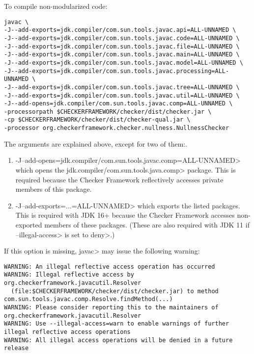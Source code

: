 
To compile non-modularized code:

\begin{Verbatim}
javac \
-J--add-exports=jdk.compiler/com.sun.tools.javac.api=ALL-UNNAMED \
-J--add-exports=jdk.compiler/com.sun.tools.javac.code=ALL-UNNAMED \
-J--add-exports=jdk.compiler/com.sun.tools.javac.file=ALL-UNNAMED \
-J--add-exports=jdk.compiler/com.sun.tools.javac.main=ALL-UNNAMED \
-J--add-exports=jdk.compiler/com.sun.tools.javac.model=ALL-UNNAMED \
-J--add-exports=jdk.compiler/com.sun.tools.javac.processing=ALL-UNNAMED \
-J--add-exports=jdk.compiler/com.sun.tools.javac.tree=ALL-UNNAMED \
-J--add-exports=jdk.compiler/com.sun.tools.javac.util=ALL-UNNAMED \
-J--add-opens=jdk.compiler/com.sun.tools.javac.comp=ALL-UNNAMED \
-processorpath $CHECKERFRAMEWORK/checker/dist/checker.jar \
-cp $CHECKERFRAMEWORK/checker/dist/checker-qual.jar \
-processor org.checkerframework.checker.nullness.NullnessChecker
\end{Verbatim}

The arguments are explained above, except for two of them:.
\begin{enumerate}

\item \<-J--add-opens=jdk.compiler/com.sun.tools.javac.comp=ALL-UNNAMED> which
opens the \<jdk.compiler/com.sun.tools.java.comp> package.  This is
required because the Checker Framework reflectively accesses private members of this package.

\item \<-J--add-exports=...=ALL-UNNAMED> which exports the listed packages.  This is
required with JDK 16+ because the Checker Framework accesses non-exported members of these packages.
(These are also required with JDK 11 if \<--illegal-access> is set to \<deny>.)

\end{enumerate}

If this option is missing, \<javac> may issue the following warning:
\begin{Verbatim}
WARNING: An illegal reflective access operation has occurred
WARNING: Illegal reflective access by org.checkerframework.javacutil.Resolver
  (file:$CHECKERFRAMEWORK/checker/dist/checker.jar) to method com.sun.tools.javac.comp.Resolve.findMethod(...)
WARNING: Please consider reporting this to the maintainers of org.checkerframework.javacutil.Resolver
WARNING: Use --illegal-access=warn to enable warnings of further illegal reflective access operations
WARNING: All illegal access operations will be denied in a future release
\end{Verbatim}


